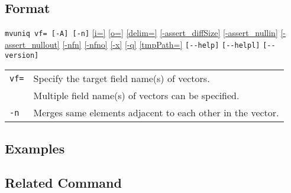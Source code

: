 \subsection*{Format}
\verb|mvuniq vf= [-A] [-n]|
\hyperref[sect:option_i]{[i=]}
\hyperref[sect:option_o]{[o=]}
\hyperref[sect:option_delim]{[delim=]} 
\hyperref[sect:option_assert_diffSize]{[-assert\_diffSize]}
\hyperref[sect:option_assert_nullin]{[-assert\_nullin]}
\hyperref[sect:option_assert_nullout]{[-assert\_nullout]}
\hyperref[sect:option_nfn]{[-nfn]} 
\hyperref[sect:option_nfno]{[-nfno]}  
\hyperref[sect:option_x]{[-x]}
\hyperref[sect:option_q]{[-q]}
\hyperref[sect:option_option_tmppath]{[tmpPath=]}
\verb|[--help]|
\verb|[--helpl]|
\verb|[--version]|\\

\begin{table}[htbp]
{\small
\begin{tabular}{ll}
\verb|vf=| & Specify the target field name(s) of vectors. \\
           & Multiple field name(s) of vectors can be specified.  \\
\verb|-n|  & Merges same elements adjacent to each other in the vector.\\
\end{tabular}
}
\end{table} 


\subsection*{Examples}


\subsection*{Related Command}


%
